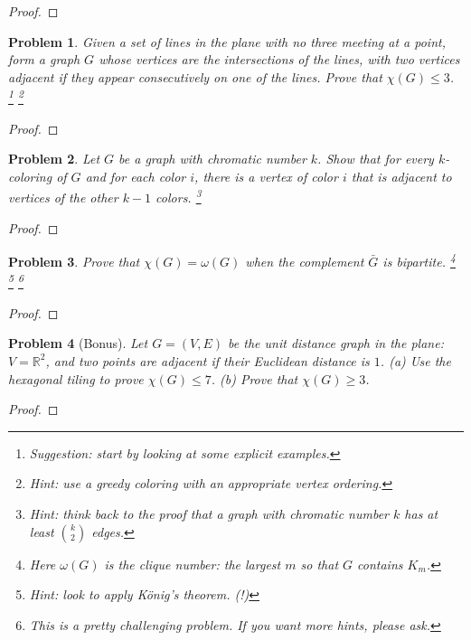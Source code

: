 \documentclass[11pt]{article}
\newtheorem{problem}{Problem}
\begin{document}
\begin{proof}

\end{proof}


\pagebreak


\begin{problem}
Given a set of lines in the plane with no three meeting at a point, form a graph $G$ whose vertices are the intersections of the lines, with two vertices adjacent if they appear consecutively on one of the lines. Prove that $\chi(G)\le3$. 
\footnote{Suggestion: start by looking at some explicit examples.} \footnote{Hint: use a greedy coloring with an appropriate vertex ordering.} 
\end{problem}

\begin{proof}

\end{proof}


\pagebreak



\begin{problem}
Let $G$ be a graph with chromatic number $k$. Show that for every $k$-coloring of $G$ and for each color $i$, there is a vertex of color $i$ that is adjacent to vertices of the other $k-1$ colors. \footnote{Hint: think back to the proof that a graph with chromatic number $k$ has at least ${k\choose 2}$ edges.}
\end{problem}

\begin{proof}

\end{proof}

\pagebreak

\begin{problem}
Prove that $\chi(G)=\omega(G)$ when the complement $\bar G$ is bipartite. \footnote{Here $\omega(G)$ is the clique number: the largest $m$ so that $G$ contains $K_m$.} \footnote{Hint: look to apply K\"onig's theorem. (!)}
\footnote{This is a pretty challenging problem. If you want more hints, please ask.} 
\end{problem}

\begin{proof}

\end{proof}

\pagebreak

\begin{problem}[Bonus]
Let $G=(V,E)$ be the unit distance graph in the plane: $V=\mathbb R^2$, and two points are adjacent if their Euclidean distance is $1$. (a) Use the hexagonal tiling to prove $\chi(G)\le7$. (b) Prove that $\chi(G)\ge3$.
\end{problem}

\begin{proof}

\end{proof}
\end{document}
